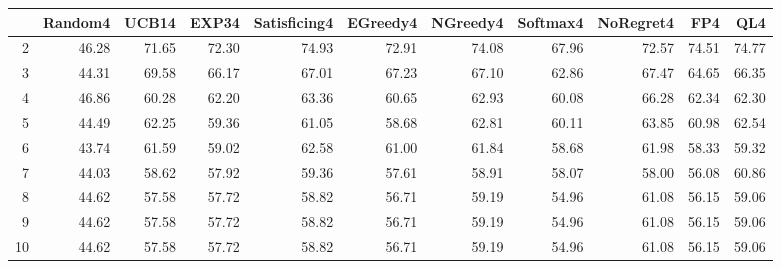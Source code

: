 \begin{table}[ht]
\centering
\begin{tabular}{rrrrrrrrrrr}
  \hline
 & Random4 & UCB14 & EXP34 & Satisficing4 & EGreedy4 & NGreedy4 & Softmax4 & NoRegret4 & FP4 & QL4 \\ 
  \hline
2 & 46.28 & 71.65 & 72.30 & 74.93 & 72.91 & 74.08 & 67.96 & 72.57 & 74.51 & 74.77 \\ 
  3 & 44.31 & 69.58 & 66.17 & 67.01 & 67.23 & 67.10 & 62.86 & 67.47 & 64.65 & 66.35 \\ 
  4 & 46.86 & 60.28 & 62.20 & 63.36 & 60.65 & 62.93 & 60.08 & 66.28 & 62.34 & 62.30 \\ 
  5 & 44.49 & 62.25 & 59.36 & 61.05 & 58.68 & 62.81 & 60.11 & 63.85 & 60.98 & 62.54 \\ 
  6 & 43.74 & 61.59 & 59.02 & 62.58 & 61.00 & 61.84 & 58.68 & 61.98 & 58.33 & 59.32 \\ 
  7 & 44.03 & 58.62 & 57.92 & 59.36 & 57.61 & 58.91 & 58.07 & 58.00 & 56.08 & 60.86 \\ 
  8 & 44.62 & 57.58 & 57.72 & 58.82 & 56.71 & 59.19 & 54.96 & 61.08 & 56.15 & 59.06 \\ 
  9 & 44.62 & 57.58 & 57.72 & 58.82 & 56.71 & 59.19 & 54.96 & 61.08 & 56.15 & 59.06 \\ 
  10 & 44.62 & 57.58 & 57.72 & 58.82 & 56.71 & 59.19 & 54.96 & 61.08 & 56.15 & 59.06 \\ 
   \hline
\end{tabular}
\end{table}
